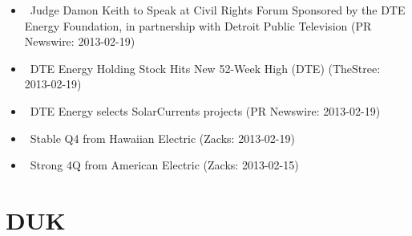 \documentclass[11pt,asymmetric]{article}
\begin{document}
\begin{itemize}
\item\ Judge Damon Keith to Speak at Civil Rights Forum Sponsored by the DTE Energy Foundation, in partnership with Detroit Public Television (PR Newswire: 2013-02-19)
\item\ DTE Energy Holding Stock Hits New 52-Week High (DTE) (TheStree: 2013-02-19)
\item\ DTE Energy selects SolarCurrents projects (PR Newswire: 2013-02-19)
\item\ Stable Q4 from Hawaiian Electric (Zacks: 2013-02-19)
\item\ Strong 4Q from American Electric (Zacks: 2013-02-15)
\end{itemize}

\section*{DUK}
\end{document}
